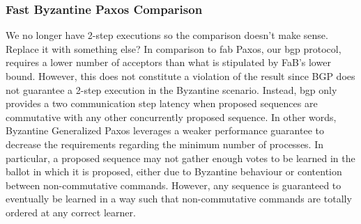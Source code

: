 \subsubsection{Fast Byzantine Paxos Comparison}
{\color{red} We no longer have 2-step executions so the comparison doesn't make sense. Replace it with something else? } In comparison to \acrshort{fab} Paxos, our \acrlong{bgp} protocol, requires a lower number of acceptors than what is stipulated by FaB's lower bound. However, this does not constitute a violation of the result since BGP does not guarantee a 2-step execution in the Byzantine scenario. Instead, \acrshort{bgp} only provides a two communication step latency when proposed sequences are commutative with any other concurrently proposed sequence. In other words, Byzantine Generalized Paxos leverages a weaker performance guarantee to decrease the requirements regarding the minimum number of processes. In particular, a proposed sequence may not gather enough votes to be learned in the ballot in which it is proposed, either due to Byzantine behaviour or contention between non-commutative commands. However, any sequence is guaranteed to eventually be learned in a way such that non-commutative commands are totally ordered at any correct learner.